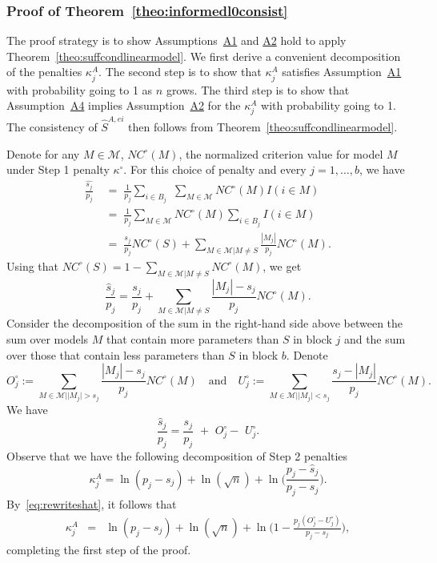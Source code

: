 \documentclass[
  12pt]{article}
\newcommand{\M}{\mathcal{M}}
\begin{document}
\subsubsection{Proof of Theorem~\ref{theo:informedl0consist}} The proof strategy is to show Assumptions~\hyperlink{lab:A}{A1} and \hyperlink{lab:A2}{A2} hold to apply Theorem~\ref{theo:suffcondlinearmodel}. We first derive a convenient decomposition of the penalties $\kappa^A_j$. The second step is to show that $\kappa^{A}_j$ satisfies Assumption~\hyperlink{lab:A1}{A1} with probability going to 1 as $n$ grows. The third step is to show that Assumption~\hyperlink{lab:A4}{A4} implies Assumption~\hyperlink{lab:A2}{A2} for the $\kappa^{A}_j$ with probability going to 1. The consistency of $\hat S^{A,ei}$ then follows from Theorem~\ref{theo:suffcondlinearmodel}.

Denote for any $M\in\M$, $NC^{\circ}(M)$, the normalized criterion value for model $M$ under Step 1 penalty $\kappa^{\circ}$. For this choice of penalty and every $j=1,\ldots,b$, we have
\begin{align*}
    \frac{\widehat{s_j}}{p_j}
    &\;=\; \frac{1}{p_j}\sum_{i\in B_j}\,\,\sum_{M\in \M}NC^{\circ}(M)I(i\in M)\\
   &\;=\; \frac{1}{p_j}\sum_{M \in \M}NC^{\circ}(M)\sum_{i \in B_j}I(i\in M) \\
   &\;=\;\frac{s_j}{p_j}NC^{\circ}(S) + \sum_{M \in \M | M \neq S}\frac{|M_j|}{p_j}NC^{\circ}(M).
\end{align*}
Using that $NC^{\circ}(S)=1-\sum_{M \in \M | M \neq S}NC^{\circ}(M)$, we get
\begin{equation*}
   \frac{\hat{s}_j}{p_j}
   =\frac{s_j}{p_j} + \sum_{M \in \M | M \neq S}\frac{|M_j|-s_j}{p_j}NC^{\circ}(M).
\end{equation*}
Consider the decomposition of the sum in the right-hand side above between the sum over models $M$ that contain more parameters than $S$ in block $j$ and the sum over those that contain less parameters than $S$  in block $b$. Denote
$$
    O_j^{\circ} := \sum_{M \in \M | |M_j| > s_j}\frac{|M_j|-s_j}{p_j}NC^{\circ}(M)\quad\text{and}\quad
    U_j^{\circ} := \sum_{M \in \M | |M_j| < s_j}\frac{s_j-|M_j|}{p_j}NC^{\circ}(M).
$$
We have
\begin{equation}\label{eq:rewriteshat}
  \frac{\hat{s}_j}{p_j}  = \frac{s_j}{p_j}\,\,+\,\, O_j^{\circ}-\,\,U_j^{\circ}.
\end{equation}
Observe that we have the following decomposition of Step 2 penalties
$$\kappa^{A}_j
    = \ln(p_j-s_j) + \ln(\sqrt{n}) + \ln\Big(\frac{p_j-\hat{s}_j}{p_j-s_j}\Big). \nonumber$$
By~\eqref{eq:rewriteshat}, it follows that
\begin{eqnarray}\label{eq:decompstep2pen}
    \kappa^{A}_j&=& \ln(p_j-s_j)+\ln(\sqrt{n})+\ln\Big(1-\frac{p_j(O^{\circ}_j-U^{\circ}_j)}{p_j-s_j}\Big),
\end{eqnarray}
completing the first step of the proof.
\end{document}

